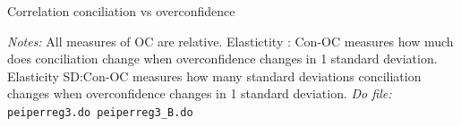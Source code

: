 \documentclass[11pt]{article}
\begin{document}
\begin{landscape}






\end{landscape}


\begin{table}[H]
    \caption{Correlation conciliation vs overconfidence}
    \label{Table_concvsoc}
    \begin{center}
        \scriptsize{}
    \end{center}
    \footnotesize
    \textit{Notes:} 
    All measures of OC are relative. Elastictity : Con-OC measures how much does conciliation change when overconfidence changes in 1 standard deviation. Elasticity SD:Con-OC measures how many standard deviations conciliation changes when  overconfidence changes in 1 standard deviation.
    \textit{Do file: } \texttt{peiperreg3.do peiperreg3\_B.do}
\end{table}


\end{document}
